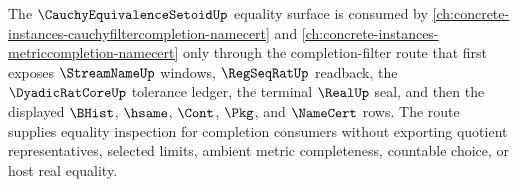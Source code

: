 The $\CauchyEquivalenceSetoidUp$ equality surface is consumed by \autoref{ch:concrete-instances-cauchyfiltercompletion-namecert} and \autoref{ch:concrete-instances-metriccompletion-namecert} only through the completion-filter route that first exposes $\StreamNameUp$ windows, $\RegSeqRatUp$ readback, the $\DyadicRatCoreUp$ tolerance ledger, the terminal $\RealUp$ seal, and then the displayed $\BHist$, $\hsame$, $\Cont$, $\Pkg$, and $\NameCert$ rows. The route supplies equality inspection for completion consumers without exporting quotient representatives, selected limits, ambient metric completeness, countable choice, or host real equality.
